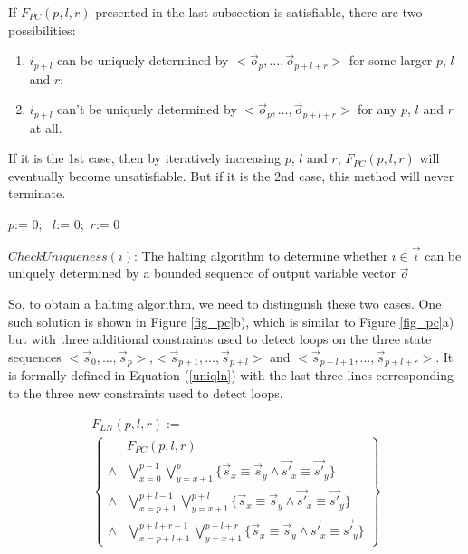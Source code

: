 \documentclass[twocolumn]{article}
\begin{document}
If $F_{PC}(p,l,r)$ presented in the last subsection is satisfiable,
there are two possibilities:
\begin{enumerate}
 \item 
$i_{p+l}$ can be uniquely determined by $<\vec{o}_{p},\dots,\vec{o}_{p+l+r}>$ for some larger $p$, $l$ and $r$;
 \item 
$i_{p+l}$ can't be uniquely determined by $<\vec{o}_{p},\dots,\vec{o}_{p+l+r}>$ for any $p$, $l$ and $r$ at all.
\end{enumerate}

If it is the 1st case,
then by iteratively increasing  $p$, $l$ and $r$,
$F_{PC}(p,l,r)$ will eventually become unsatisfiable.
But if it is the 2nd case,
this method will never terminate.

\begin{algorithm}[t]
\SetAlgoVlined
{}
$p$:= 0; ~$l$:= 0;~$r$:= 0\;
\caption{$CheckUniqueness(i)$: The halting algorithm to determine 
whether $i\in\vec{i}$ can be uniquely determined by a bounded sequence of output variable vector $\vec{o}$}
\label{alg_pcln}
\end{algorithm}

So,
to obtain a halting algorithm,
we need to distinguish these two cases.
One such solution is shown in Figure \ref{fig_pc}b),
which is similar to Figure \ref{fig_pc}a) but with three additional constraints used to detect loops 
on the three state sequences $<\vec{s}_{0},\dots,\vec{s}_{p}>$,$<\vec{s}_{p+1},\dots,\vec{s}_{p+l}>$ and 
$<\vec{s}_{p+l+1},\dots,\vec{s}_{p+l+r}>$.
It is formally defined in Equation (\ref{uniqln}) with the last three lines corresponding to the three new constraints used to detect loops.

\begin{multline}\label{uniqln}
F_{LN}(p,l,r):=\\
\left\{
\begin{array}{cc}
&F_{PC}(p,l,r)\\
\wedge&\bigvee_{x=0}^{p-1}\bigvee_{y=x+1}^{p} \{\vec{s}_x\equiv \vec{s}_y\wedge \vec{s'}_x\equiv \vec{s'}_y\} \\
\wedge&\bigvee_{x=p+1}^{p+l-1}\bigvee_{y=x+1}^{p+l} \{\vec{s}_x\equiv \vec{s}_y\wedge \vec{s'}_x\equiv \vec{s'}_y\} \\
\wedge&\bigvee_{x=p+l+1}^{p+l+r-1}\bigvee_{y=x+1}^{p+l+r} \{\vec{s}_x\equiv \vec{s}_y\wedge \vec{s'}_x\equiv \vec{s'}_y\}
\end{array}
\right\}
\end{multline}
\end{document}
